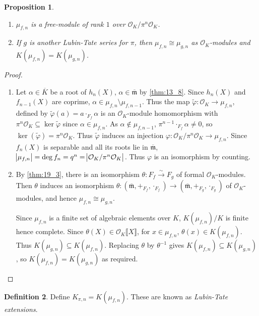 \documentclass[11pt]{article}
\theoremstyle{definition}
\newtheorem{definition}{Definition}[subsection]
\theoremstyle{plain}
\newtheorem{proposition}[definition]{Proposition}
\theoremstyle{remark}
\newcommand{\cO}{\mathcal{O}}
\newcommand{\fm}{\mathfrak{m}}
\begin{document}
\begin{proposition}\label{prop:20:4}\phantom{}
    \begin{enumerate}
        \item $\mu_{f,n}$ is a free-module of rank $1$ over $\cO_K / \pi^n \cO_K$.
        \item If $g$ is another Lubin-Tate series for $\pi$, then $\mu_{f, n} \cong \mu_{g, n}$ as $\cO_K$-modules and $K(\mu_{f,n}) = K(\mu_{g, n})$.
    \end{enumerate}
\end{proposition}
\begin{proof}\phantom{}
    \begin{enumerate}
        \item Let $\alpha \in \overline{K}$ be a root of $h_n(X)$, $\alpha \in \overline{\fm}$ by \autoref{thm:13_8}. Since $h_n(X)$ and $f_{n-1}(X)$ are coprime, $\alpha \in \mu_{f,n} \setminus \mu_{f,n-1}$. Thus the map $\widetilde{\varphi} : \cO_K \to \mu_{f, n}$, defined by $\widetilde{\varphi}(a) = a \cdot_{F_f} \alpha$ is an $\cO_K$-module homomorphism with $\pi^n \cO_K \subseteq \ker{\widetilde{\varphi}}$ since $\alpha \in \mu_{f,n}$. As $\alpha \notin \mu_{f,n-1}$, $\pi^{n-1} \cdot_{F_f} \alpha \neq 0$, so $\ker(\widetilde{\varphi}) = \pi^n \cO_K$. Thus $\widetilde{\varphi}$ induces an injection $\varphi : \cO_K / \pi^n \cO_K \to \mu_{f,n}$. Since $f_n(X)$ is separable and all its roots lie in $\overline{\fm}$, $\abs{\mu_{f,n}} = \deg f_n = q^n = \abs{\cO_K / \pi^n \cO_K}$. Thus $\varphi$ is an isomorphism by counting.

        \item By \autoref{thm:19_3}, there is an isomorphism $\theta : F_f \xrightarrow{\sim} F_g$ of formal $\cO_K$-modules. Then $\theta$ induces an isomorphism $\theta : (\overline{\fm}, +_{F_f}, \cdot_{F_f}) \to (\overline{\fm}, +_{F_g}, \cdot_{F_g})$ of $\cO_K$-modules, and hence $\mu_{f,n} \cong \mu_{g,n}$.

            Since $\mu_{f,n}$ is a finite set of algebraic elements over $K$, $K(\mu_{f,n})/K$ is finite hence complete. Since $\theta(X) \in \cO_K \llbracket X \rrbracket$, for $x \in \mu_{f,n}$, $\theta(x) \in K(\mu_{f,n})$. Thus $K(\mu_{g,n}) \subseteq K(\mu_{f,n})$. Replacing $\theta$ by $\theta^{-1}$ gives $K(\mu_{f,n}) \subseteq K(\mu_{g,n})$, so $K(\mu_{f,n}) = K(\mu_{g,n})$ as required. \qedhere
    \end{enumerate}
\end{proof}

\begin{definition}\label{def:20_5}
    Define $K_{\pi,n} = K(\mu_{f,n})$. These are known as \emph{Lubin-Tate extensions}.
\end{definition}
\end{document}
